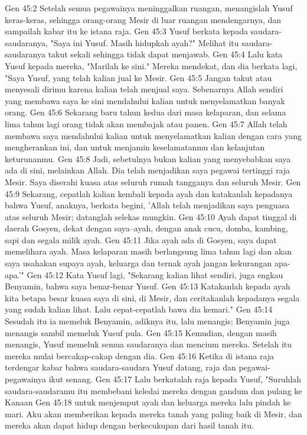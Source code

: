 Gen 45:2  Setelah semua pegawainya meninggalkan ruangan, menangislah Yusuf keras-keras, sehingga orang-orang Mesir di luar ruangan mendengarnya, dan sampailah kabar itu ke istana raja.
Gen 45:3  Yusuf berkata kepada saudara-saudaranya, "Saya ini Yusuf. Masih hidupkah ayah?" Melihat itu saudara-saudaranya takut sekali sehingga tidak dapat menjawab.
Gen 45:4  Lalu kata Yusuf kepada mereka, "Marilah ke sini." Mereka mendekat, dan dia berkata lagi, "Saya Yusuf, yang telah kalian jual ke Mesir.
Gen 45:5  Jangan takut atau menyesali dirimu karena kalian telah menjual saya. Sebenarnya Allah sendiri yang membawa saya ke sini mendahului kalian untuk menyelamatkan banyak orang.
Gen 45:6  Sekarang baru tahun kedua dari masa kelaparan, dan selama lima tahun lagi orang tidak akan membajak atau panen.
Gen 45:7  Allah telah membawa saya mendahului kalian untuk menyelamatkan kalian dengan cara yang mengherankan ini, dan untuk menjamin keselamatanmu dan kelanjutan keturunanmu.
Gen 45:8  Jadi, sebetulnya bukan kalian yang menyebabkan saya ada di sini, melainkan Allah. Dia telah menjadikan saya pegawai tertinggi raja Mesir. Saya diserahi kuasa atas seluruh rumah tangganya dan seluruh Mesir.
Gen 45:9  Sekarang, cepatlah kalian kembali kepada ayah dan katakanlah kepadanya bahwa Yusuf, anaknya, berkata begini, 'Allah telah menjadikan saya penguasa atas seluruh Mesir; datanglah selekas mungkin.
Gen 45:10  Ayah dapat tinggal di daerah Gosyen, dekat dengan saya--ayah, dengan anak cucu, domba, kambing, sapi dan segala milik ayah.
Gen 45:11  Jika ayah ada di Gosyen, saya dapat memelihara ayah. Masa kelaparan masih berlangsung lima tahun lagi dan akan saya usahakan supaya ayah, keluarga dan ternak ayah jangan kekurangan apa-apa.'"
Gen 45:12  Kata Yusuf lagi, "Sekarang kalian lihat sendiri, juga engkau Benyamin, bahwa saya benar-benar Yusuf.
Gen 45:13  Katakanlah kepada ayah kita betapa besar kuasa saya di sini, di Mesir, dan ceritakanlah kepadanya segala yang sudah kalian lihat. Lalu cepat-cepatlah bawa dia kemari."
Gen 45:14  Sesudah itu ia memeluk Benyamin, adiknya itu, lalu menangis; Benyamin juga menangis sambil memeluk Yusuf pula.
Gen 45:15  Kemudian, dengan masih menangis, Yusuf memeluk semua saudaranya dan mencium mereka. Setelah itu mereka mulai bercakap-cakap dengan dia.
Gen 45:16  Ketika di istana raja terdengar kabar bahwa saudara-saudara Yusuf datang, raja dan pegawai-pegawainya ikut senang.
Gen 45:17  Lalu berkatalah raja kepada Yusuf, "Suruhlah saudara-saudaramu itu membebani keledai mereka dengan gandum dan pulang ke Kanaan
Gen 45:18  untuk menjemput ayah dan keluarga mereka lalu pindah ke mari. Aku akan memberikan kepada mereka tanah yang paling baik di Mesir, dan mereka akan dapat hidup dengan berkecukupan dari hasil tanah itu.
